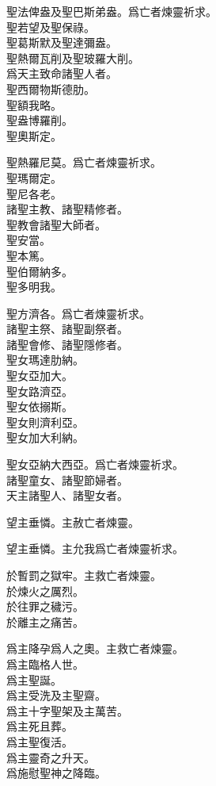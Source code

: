 \versicle 聖法俾盎及聖巴斯弟盎。\hfill \response 爲亡者煉靈祈求。\\
聖若望及聖保祿。\\
聖葛斯默及聖達彌盎。\\
聖熱爾瓦削及聖玻羅大削。\\
爲天主致命諸聖人者。\\
聖西爾物斯德肋。\\
聖額我略。\\
聖盎博羅削。\\
聖奧斯定。

\versicle 聖熱羅尼莫。\hfill \response 爲亡者煉靈祈求。\\
聖瑪爾定。\\
聖尼各老。\\
諸聖主教、諸聖精修者。\\
聖教會諸聖大師者。\\
聖安當。\\
聖本篤。\\
聖伯爾納多。\\
聖多明我。

\versicle 聖方濟各。\hfill \response 爲亡者煉靈祈求。\\
諸聖主祭、諸聖副祭者。\\
諸聖會修、諸聖隱修者。\\
聖女瑪達肋納。\\
聖女亞加大。\\
聖女路濟亞。\\
聖女依搦斯。\\
聖女則濟利亞。\\
聖女加大利納。

\versicle 聖女亞納大西亞。\hfill \response 爲亡者煉靈祈求。\\
諸聖童女、諸聖節婦者。\\
天主諸聖人、諸聖女者。

\versicle 望主垂憐。\hfill \response 主赦亡者煉靈。

\versicle 望主垂憐。\hfill \response 主允我爲亡者煉靈祈求。

\versicle 於暫罰之獄牢。\hfill \response 主救亡者煉靈。\\
於煉火之厲烈。\\
於往罪之穢污。\\
於離主之痛苦。

\versicle 爲主降孕爲人之奧。\hfill \response 主救亡者煉靈。\\
爲主臨格人世。\\
爲主聖誕。\\
爲主受洗及主聖齋。\\
爲主十字聖架及主萬苦。\\
爲主死且葬。\\
爲主聖復活。\\
爲主靈奇之升天。\\
爲施慰聖神之降臨。

